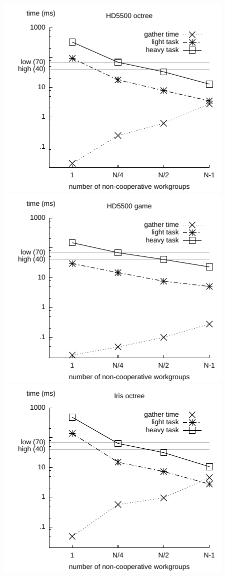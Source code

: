 \documentclass[sigconf]{acmart}
\begin{document}
{\includegraphics[width=.7\columnwidth]{images/ws/hd5500_octree_NA.pdf} \\
\includegraphics[width=.7\columnwidth]{images/ws/hd5500_connect_four_NA.pdf} \\
\includegraphics[width=.7\columnwidth]{images/ws/iris_octree_NA.pdf} \\
}
\end{document}
